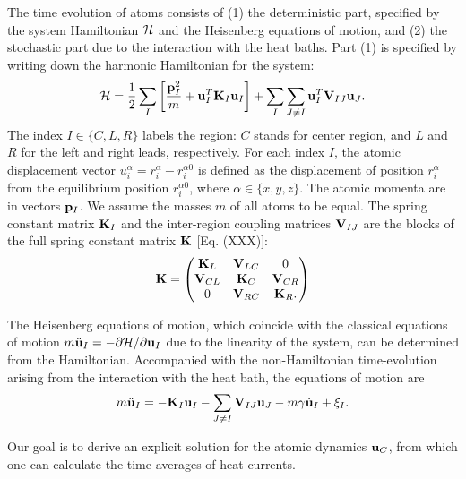 The time evolution of atoms consists of (1) the deterministic part, specified by the system Hamiltonian $\mathcal{H}$ and the Heisenberg equations of motion, and (2) the stochastic part due to the interaction with the heat baths.  Part (1) is specified by writing down the harmonic Hamiltonian for the system:
\begin{equation}
 \mathcal{H} = \frac{1}{2}  \sum_I \left[ \frac{\mathbf{p}_I^2}{m}+\mathbf{u}_I^T\mathbf{K}_I \mathbf{u}_I \right] + \sum_I \sum_{J\neq I} \mathbf{u}_I^T \mathbf{V}_{IJ} \mathbf{u}_J.
\end{equation}
The index $I\in\{C,L,R\}$ labels the region: $C$ stands for center region, and $L$ and $R$ for the left and right leads, respectively. For each index $I$, the atomic displacement vector $u_i^{\alpha}=r_i^{\alpha}-r_i^{\alpha 0}$ is defined as the displacement of position $r_i^{\alpha}$ from the equilibrium position $r^{\alpha 0}_i$, where $\alpha\in\{x,y,z\}$. The atomic momenta are in vectors $\mathbf{p}_I$. We assume the masses $m$ of all atoms to be equal. The spring constant matrix $\mathbf{K}_I$ and the inter-region coupling matrices $\mathbf{V}_{IJ}$ are the blocks of the full spring constant matrix $\mathbf{K}$ [Eq. (XXX)]:
\begin{equation}
 \mathbf{K} = \left(\begin{matrix}
                 \mathbf{K}_L & \mathbf{V}_{LC} & 0 \\
		\mathbf{V}_{CL} & \mathbf{K}_C & \mathbf{V}_{CR} \\
		0 & \mathbf{V}_{RC} & \mathbf{K}_R.
                \end{matrix}
 \right)
\end{equation}
 
The Heisenberg equations of motion, which coincide with the classical equations of motion $m\ddot{\mathbf{u}}_I=-\partial \mathcal{H}/\partial \mathbf{u}_I$ due to the linearity of the system, can be determined from the Hamiltonian. Accompanied with the non-Hamiltonian time-evolution arising from the interaction with the heat bath, the equations of motion are
\begin{equation}
  m\ddot{\mathbf{u}}_I = - \mathbf{K}_I \mathbf{u}_I - \sum_{J\neq I} \mathbf{V}_{IJ} \mathbf{u}_J - m \gamma \dot{\mathbf{u}}_I + \xi_I. \label{eq:gfm_eom_I}
\end{equation}

Our goal is to derive an explicit solution for the atomic dynamics $\mathbf{u}_C$, from which one can calculate the time-averages of heat currents.

